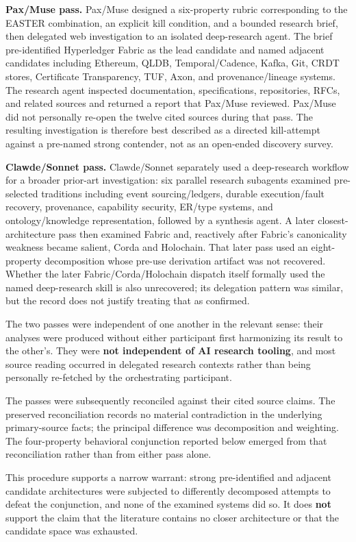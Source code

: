 \documentclass[11pt]{article}
\begin{document}
\textbf{Pax/Muse pass.} Pax/Muse designed a six-property rubric corresponding to the EASTER combination, an explicit kill condition, and a bounded research brief, then delegated web investigation to an isolated deep-research agent. The brief pre-identified Hyperledger Fabric as the lead candidate and named adjacent candidates including Ethereum, QLDB, Temporal/Cadence, Kafka, Git, CRDT stores, Certificate Transparency, TUF, Axon, and provenance/lineage systems. The research agent inspected documentation, specifications, repositories, RFCs, and related sources and returned a report that Pax/Muse reviewed. Pax/Muse did not personally re-open the twelve cited sources during that pass. The resulting investigation is therefore best described as a directed kill-attempt against a pre-named strong contender, not as an open-ended discovery survey.

\textbf{Clawde/Sonnet pass.} Clawde/Sonnet separately used a deep-research workflow for a broader prior-art investigation: six parallel research subagents examined pre-selected traditions including event sourcing/ledgers, durable execution/fault recovery, provenance, capability security, ER/type systems, and ontology/knowledge representation, followed by a synthesis agent. A later closest-architecture pass then examined Fabric and, reactively after Fabric's canonicality weakness became salient, Corda and Holochain. That later pass used an eight-property decomposition whose pre-use derivation artifact was not recovered. Whether the later Fabric/Corda/Holochain dispatch itself formally used the named deep-research skill is also unrecovered; its delegation pattern was similar, but the record does not justify treating that as confirmed.

The two passes were independent of one another in the relevant sense: their analyses were produced without either participant first harmonizing its result to the other's. They were \textbf{not independent of AI research tooling}, and most source reading occurred in delegated research contexts rather than being personally re-fetched by the orchestrating participant.

The passes were subsequently reconciled against their cited source claims. The preserved reconciliation records no material contradiction in the underlying primary-source facts; the principal difference was decomposition and weighting. The four-property behavioral conjunction reported below emerged from that reconciliation rather than from either pass alone.

This procedure supports a narrow warrant: strong pre-identified and adjacent candidate architectures were subjected to differently decomposed attempts to defeat the conjunction, and none of the examined systems did so. It does \textbf{not} support the claim that the literature contains no closer architecture or that the candidate space was exhausted.
\end{document}
